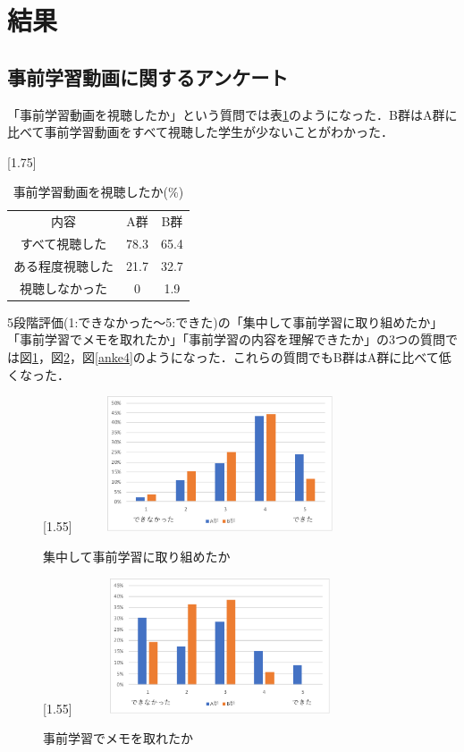 \documentclass[a4j,11pt]{jsarticle}
\begin{document}
\newpage

\section{結果}
\subsection{事前学習動画に関するアンケート}
「事前学習動画を視聴したか」という質問では表\ref{anke1}のようになった．B群はA群に比べて事前学習動画をすべて視聴した学生が少ないことがわかった．


\begin{table}[htbp]
\begin{center}
\caption{事前学習動画を視聴したか(\%)}
\scalebox{1.75}[1.75]{
\begin{tabular}{|c|c|c|}
\cline{1-3}
内容 & A群 & B群  \\ \cline{1-3}  
 すべて視聴した& 78.3 & 65.4 \\ \cline{1-3}  
 ある程度視聴した& 21.7 & 32.7 \\ \cline{1-3}  
 視聴しなかった & 0 & 1.9 \\ \cline{1-3}  
\end{tabular}
}
\label{anke1}
\end{center}
\end{table}

5段階評価(1:できなかった〜5:できた)の「集中して事前学習に取り組めたか」「事前学習でメモを取れたか」「事前学習の内容を理解できたか」の3つの質問では図\ref{anke2}，図\ref{anke3}，図\ref{anke4}のようになった．これらの質問でもB群はA群に比べて低くなった．


\begin{figure}[h]
\begin{center}
\scalebox{1.2}[1.55]{
 \includegraphics[clip,width=85mm,height=40mm]{anke2.pdf}
 }
\end{center}
 \caption{集中して事前学習に取り組めたか}
 \label{anke2}
\end{figure}

\newpage


\begin{figure}[h]
\begin{center}
\scalebox{1.2}[1.55]{
 \includegraphics[clip,width=85mm,height=40mm]{anke3.pdf}
 }
\end{center}
 \caption{事前学習でメモを取れたか}
 \label{anke3}
\end{figure}
\end{document}
